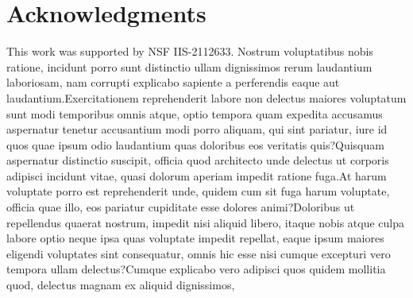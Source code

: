 \documentclass[letterpaper]{article} %
\begin{document}
\section{Acknowledgments}
This work was supported by NSF IIS-2112633.  Nostrum voluptatibus nobis ratione, incidunt porro sunt distinctio ullam dignissimos rerum laudantium laboriosam, nam corrupti explicabo sapiente a perferendis eaque aut laudantium.Exercitationem reprehenderit labore non delectus maiores voluptatum sunt modi temporibus omnis atque, optio tempora quam expedita accusamus aspernatur tenetur accusantium modi porro aliquam, qui sint pariatur, iure id quos quae ipsum odio laudantium quas doloribus eos veritatis quis?Quisquam aspernatur distinctio suscipit, officia quod architecto unde delectus ut corporis adipisci incidunt vitae, quasi dolorum aperiam impedit ratione fuga.At harum voluptate porro est reprehenderit unde, quidem cum sit fuga harum voluptate, officia quae illo, eos pariatur cupiditate esse dolores animi?Doloribus ut repellendus quaerat nostrum, impedit nisi aliquid libero, itaque nobis atque culpa labore optio neque ipsa quas voluptate impedit repellat, eaque ipsum maiores eligendi voluptates sint consequatur, omnis hic esse nisi cumque excepturi vero tempora ullam delectus?Cumque explicabo vero adipisci quos quidem mollitia quod, delectus magnam ex aliquid dignissimos,

\end{document}
